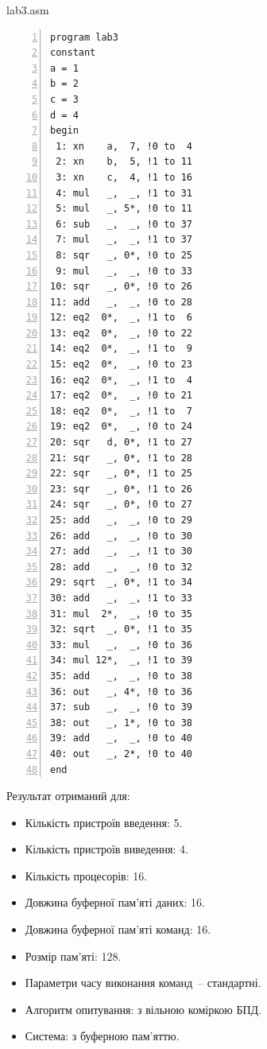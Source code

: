 \documentclass[a4paper, 10pt]{article}
\begin{document}
lab3.asm
\begin{lstlisting}[numbers=left]
program lab3
constant
a = 1
b = 2
c = 3
d = 4
begin
 1: xn    a,  7, !0 to  4
 2: xn    b,  5, !1 to 11
 3: xn    c,  4, !1 to 16
 4: mul   _,  _, !1 to 31
 5: mul   _, 5*, !0 to 11
 6: sub   _,  _, !0 to 37
 7: mul   _,  _, !1 to 37
 8: sqr   _, 0*, !0 to 25
 9: mul   _,  _, !0 to 33
10: sqr   _, 0*, !0 to 26
11: add   _,  _, !0 to 28
12: eq2  0*,  _, !1 to  6
13: eq2  0*,  _, !0 to 22
14: eq2  0*,  _, !1 to  9
15: eq2  0*,  _, !0 to 23
16: eq2  0*,  _, !1 to  4
17: eq2  0*,  _, !0 to 21
18: eq2  0*,  _, !1 to  7
19: eq2  0*,  _, !0 to 24
20: sqr   d, 0*, !1 to 27
21: sqr   _, 0*, !1 to 28
22: sqr   _, 0*, !1 to 25
23: sqr   _, 0*, !1 to 26
24: sqr   _, 0*, !0 to 27
25: add   _,  _, !0 to 29
26: add   _,  _, !0 to 30
27: add   _,  _, !1 to 30
28: add   _,  _, !0 to 32
29: sqrt  _, 0*, !1 to 34
30: add   _,  _, !1 to 33
31: mul  2*,  _, !0 to 35
32: sqrt  _, 0*, !1 to 35
33: mul   _,  _, !0 to 36
34: mul 12*,  _, !1 to 39
35: add   _,  _, !0 to 38
36: out   _, 4*, !0 to 36
37: sub   _,  _, !0 to 39
38: out   _, 1*, !0 to 38
39: add   _,  _, !0 to 40
40: out   _, 2*, !0 to 40
end
\end{lstlisting}

Результат отриманий для:\\
\begin{itemize}
	\item Кількість пристроїв введення: 5.
	\item Кількість пристроїв виведення: 4.
	\item Кількість процесорів: 16.
	\item Довжина буферної пам'яті даних: 16.
	\item Довжина буферної пам'яті команд: 16.
	\item Розмір пам'яті: 128.
	\item Параметри часу виконання команд~-- стандартні.
	\item Алгоритм опитування: з вільною коміркою БПД.
	\item Система: з буферною пам'яттю.
\end{itemize}
\end{document}
